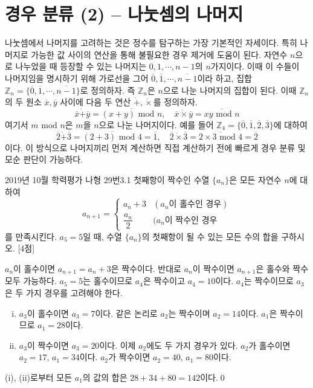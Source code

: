 \documentclass{article}
\begin{document}
\section{경우 분류 (2) -- 나눗셈의 나머지}
나눗셈에서 나머지를 고려하는 것은 정수를 탐구하는 가장 기본적인 자세이다. 특히 나머지로 가능한 값 사이의 연산을 통해 불필요한 경우 제거에 도움이 된다. 자연수 $n$으로 나누었을 때 등장할 수 있는 나머지는 $0,1,\cdots,n-1$의 $n$가지이다. 이때 이 수들이 나머지임을 명시하기 위해 가로선을 그어 $\overline{0},\overline{1},\cdots,\overline{n-1}$이라 하고, 집합 $\mathbb Z_n=\{\overline{0},\overline{1},\cdots,\overline{n-1}\}$로 정의하자. 즉 $\mathbb Z_n$은 $n$으로 나눈 나머지의 집합이 된다. 이때 $\mathbb Z_n$의 두 원소 $\overline{x},\overline{y}$ 사이에 다음 두 연산 $\dot+,\dot\times$를 정의하자.
\[
	\overline{x}\dot+\overline{y}=\overline{(x+y)\text{ mod }n},\quad\overline{x}\dot\times\overline{y}=\overline{xy\text{ mod }n}
\]
여기서 $m\text{ mod }n$은 $m$을 $n$으로 나눈 나머지이다. 예를 들어 $\mathbb Z_4=\{\overline{0},\overline{1},\overline{2},\overline{3}\}$에 대하여
\[
	\overline{2}\dot+\overline{3}=\overline{(2+3)\text{ mod }4}=\overline{1},\quad\overline{2}\dot\times\overline{3}=\overline{2\times 3\text{ mod }4}=\overline{2}
\]
이다. 이 방식으로 나머지끼리 먼저 계산하면 직접 계산하기 전에 빠르게 경우 분류 및 모순 판단이 가능하다.

\newpage
\begin{exc}{2019년 10월 학력평가 나형 29번}{3.1}
	첫째항이 짝수인 수열 $\{a_n\}$은 모든 자연수 $n$에 대하여
	\[
		a_{n+1}=\begin{cases}
			a_n+3 & (a_n\text{이 홀수인 경우})\\[3pt]
			\dfrac{a_n}{2} & (a_n\text{이 짝수인 경우}
		\end{cases}
	\]
	를 만족시킨다. $a_5=5$일 때, 수열 $\{a_n\}$의 첫째항이 될 수 있는 모든 수의 합을 구하시오. [4점]	
\end{exc}

\begin{sol}
	$a_n$이 홀수이면 $a_{n+1}=a_n+3$은 짝수이다. 반대로 $a_n$이 짝수이면 $a_{n+1}$은 홀수와 짝수 모두 가능하다. $a_5=5$는 홀수이므로 $a_4$은 짝수이고 $a_4=10$이다. $a_4$는 짝수이므로 $a_3$은 두 가지 경우를 고려해야 한다.
	\begin{enumerate}[(i)]
		\item $a_3$이 홀수이면 $a_3=7$이다. 같은 논리로 $a_2$는 짝수이며 $a_2=14$이다. $a_1$은 짝수이므로 $a_1=28$이다.
		\item $a_3$이 짝수이면 $a_3=20$이다. 이제 $a_2$에도 두 가지 경우가 있다. $a_2$가 홀수이면 $a_2=17$, $a_1=34$이다. $a_2$가 짝수이면 $a_2=40$, $a_1=80$이다.
	\end{enumerate}
	(i), (ii)로부터 모든 $a_1$의 값의 합은 $28+34+80=142$이다.\qed
\end{sol}
\end{document}
